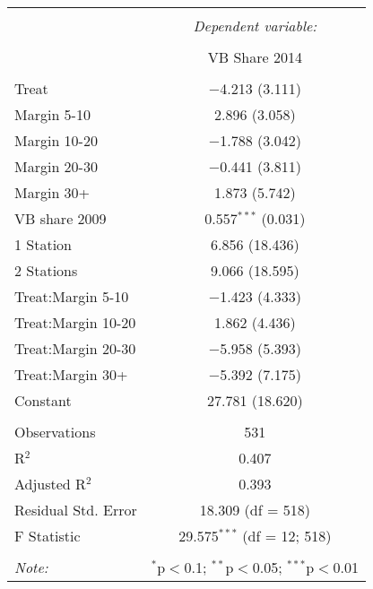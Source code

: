 
\begin{table}[!htbp] \centering 
  \caption{} 
  \label{} 
\begin{tabular}{@{\extracolsep{5pt}}lc} 
\\[-1.8ex]\hline 
\hline \\[-1.8ex] 
 & \multicolumn{1}{c}{\textit{Dependent variable:}} \\ 
\cline{2-2} 
\\[-1.8ex] & VB Share 2014 \\ 
\hline \\[-1.8ex] 
 Treat & $-$4.213 (3.111) \\ 
  Margin 5-10 & 2.896 (3.058) \\ 
  Margin 10-20 & $-$1.788 (3.042) \\ 
  Margin 20-30 & $-$0.441 (3.811) \\ 
  Margin 30+ & 1.873 (5.742) \\ 
  VB share 2009 & 0.557$^{***}$ (0.031) \\ 
  1 Station & 6.856 (18.436) \\ 
  2 Stations & 9.066 (18.595) \\ 
  Treat:Margin 5-10 & $-$1.423 (4.333) \\ 
  Treat:Margin 10-20 & 1.862 (4.436) \\ 
  Treat:Margin 20-30 & $-$5.958 (5.393) \\ 
  Treat:Margin 30+ & $-$5.392 (7.175) \\ 
  Constant & 27.781 (18.620) \\ 
 \hline \\[-1.8ex] 
Observations & 531 \\ 
R$^{2}$ & 0.407 \\ 
Adjusted R$^{2}$ & 0.393 \\ 
Residual Std. Error & 18.309 (df = 518) \\ 
F Statistic & 29.575$^{***}$ (df = 12; 518) \\ 
\hline 
\hline \\[-1.8ex] 
\textit{Note:}  & \multicolumn{1}{r}{$^{*}$p$<$0.1; $^{**}$p$<$0.05; $^{***}$p$<$0.01} \\ 
\end{tabular} 
\end{table} 
